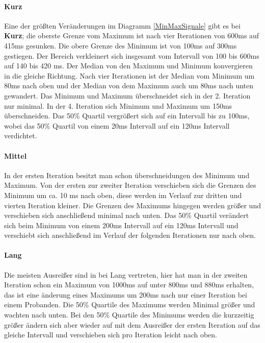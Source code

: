 \paragraph{Kurz}
Eine der gr{\"o}{\ss}ten Ver{\"a}nderungen im Diagramm \autoref{MinMaxSignale} gibt es bei \textbf{Kurz}; die oberste Grenze vom Maximum ist nach vier Iterationen von 600ms auf 415ms gesunken. Die obere Grenze des Minimum ist von 100ms auf 300ms gestiegen. 
Der Bereich verkleinert sich insgesamt vom Intervall von 100 bis 600ms auf 140 bis 420 ms. 
Der Median von den Maximum und Minimum konvergieren in die gleiche Richtung. Nach vier Iterationen ist der Median vom Minimum um 80ms nach oben und der Median von dem Maximum auch um 80ms nach unten gewandert. 
Das Minimum und Maximum {\"u}berschneidet sich in der 2. Iteration nur minimal. In der 4. Iteration sich Minimum und Maximum um 150ms {\"u}berschneiden. Das 50\% Quartil vergr{\"o}{\ss}ert sich auf ein Intervall bis zu 100ms, wobei das 50\% Quartil von einem 20ms Intervall auf ein 120ms Intervall verdichtet. 


\paragraph{Mittel}
In der ersten Iteration besitzt man schon {\"u}berschneidungen des Minimum und Maximum. Von der ersten zur zweiter Iteration verschieben sich die Grenzen des Minimum um ca. 10 ms nach oben, diese werden im Verlauf zur dritten und vierten Iteration kleiner.  Die Grenzen des Maximums hingegen werden gr{\"o}{\ss}er und verschieben sich anschlie{\ss}end minimal nach unten. Das 50\% Quartil ver{\"a}ndert sich beim Minimum von einem 200ms Intervall auf ein 120ms Intervall und verschiebt sich anschlie{\ss}end im Verlauf der folgenden Iterationen nur nach oben. 

\paragraph{Lang}
Die meisten Ausrei{\ss}er sind in bei Lang vertreten, hier hat man in der zweiten Iteration schon ein Maximum von 1000ms auf unter 800ms und 880ms erhalten, das ist eine {\"a}nderung eines Maximums um 200ms nach nur einer Iteration bei einem Probanden.
Die 50\% Quartile des Maximums werden Minimal gr{\"o}{\ss}er und wachten nach unten.
Bei den 50\% Quartile des Minimums werden die kurzzeitig gr{\"o}{\ss}er {\"a}ndern sich aber wieder auf mit dem Ausrei{\ss}er der ersten Iteration auf das gleiche Intervall und verschieben sich pro Iteration leicht nach oben.


